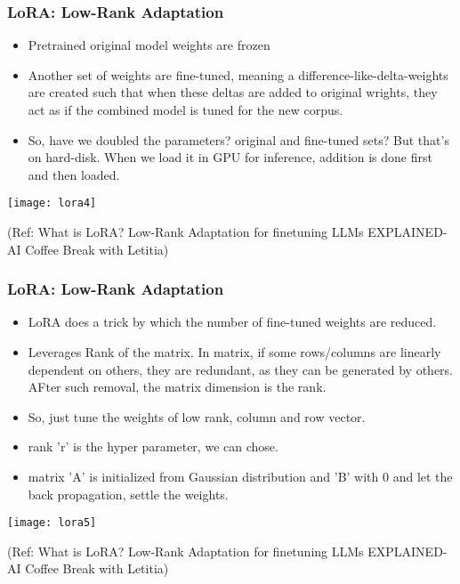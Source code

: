 \begin{frame}[fragile]\frametitle{LoRA: Low-Rank Adaptation}
    \begin{itemize}
        \item Pretrained original model weights are frozen
		\item Another set of weights are fine-tuned, meaning a difference-like-delta-weights are created such that when these deltas are added to original wrights, they act as if the combined model is tuned for the new corpus.
		\item So, have we doubled the parameters? original and fine-tuned sets? But that's on hard-disk. When we load it in GPU for inference, addition is done first and then loaded.
    \end{itemize}

		\begin{center}
		\texttt{[image: lora4]}
		
		{\tiny (Ref: What is LoRA? Low-Rank Adaptation for finetuning LLMs EXPLAINED-AI Coffee Break with Letitia)}
		\end{center}

\end{frame}

\begin{frame}[fragile]\frametitle{LoRA: Low-Rank Adaptation}
    \begin{itemize}
        \item LoRA does a trick by which the number of fine-tuned weights are reduced.
		\item Leverages Rank of the matrix. In matrix, if some rows/columns are linearly dependent on others, they are redundant, as they can be generated by others. AFter such removal, the matrix dimension is the rank.
		\item So, just tune the weights of low rank, column and row vector.
		\item rank 'r' is the hyper parameter, we can chose.
		\item matrix 'A' is initialized from Gaussian distribution and 'B' with $0$ and let the back propagation, settle the weights.
    \end{itemize}

		\begin{center}
		\texttt{[image: lora5]}
		
		{\tiny (Ref: What is LoRA? Low-Rank Adaptation for finetuning LLMs EXPLAINED-AI Coffee Break with Letitia)}
		\end{center}

\end{frame}



